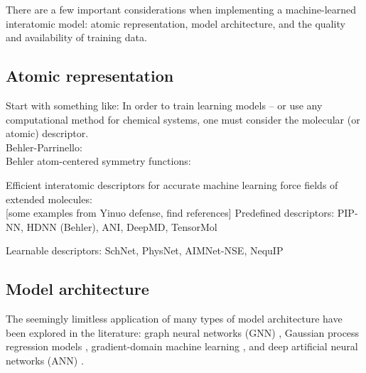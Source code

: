 There are a few important considerations when implementing a machine-learned interatomic model: atomic representation, model architecture, and the quality and availability of training data. 


\subsection{Atomic representation}
Start with something like: 
In order to train learning models -- or use any computational method for chemical systems, one must consider the molecular (or atomic) descriptor. \\
Behler-Parrinello: \cite{behler_parrinello}\\
Behler atom-centered symmetry functions: \cite{atom_centered_symmetry_function_behler}\\


Efficient interatomic descriptors for accurate machine learning force fields of extended molecules: \cite{interatomic_descriptors_kabylda}\\

[some examples from Yinuo defense, find references]
Predefined descriptors: PIP-NN, HDNN (Behler), ANI, DeepMD, TensorMol 

Learnable descriptors: SchNet, PhysNet, AIMNet-NSE, NequIP




\subsection{Model architecture}


The seemingly limitless application of many types of model architecture have been explored in the literature:
graph neural networks (GNN) \cite{gnn_property_prediction1, gnn_property_prediction2}, 
Gaussian process regression models \cite{gaussian_process_regression1,gaussian_process_regression2}, 
gradient-domain machine learning \cite{ml_energy_conserving_ff_chmiela}, 
and deep artificial neural networks (ANN) \cite{pes_fitted_by_NN_handley, ab_initio_pes_using_ml_lu, ml_pes_jiang}. 

